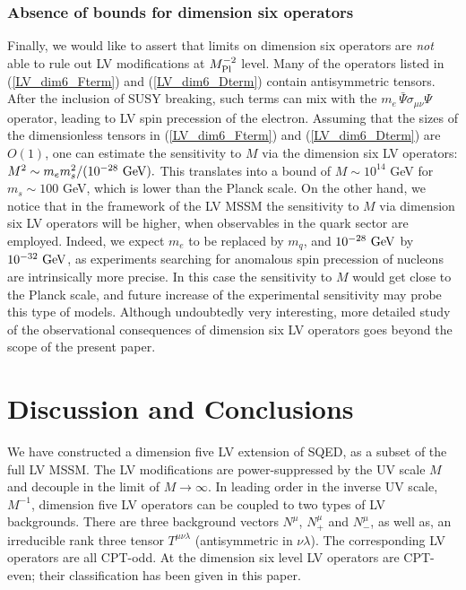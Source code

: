 \documentclass[12pt]{revtex4}
\begin{document}
\subsubsection*{Absence of bounds for dimension six operators}


Finally, we would like to assert that limits on dimension six operators 
are {\em not} able to rule out LV modifications at $M^{-2}_{\rm Pl}$ level. 
Many of the operators listed in (\ref{LV_dim6_Fterm}) and
(\ref{LV_dim6_Dterm}) contain antisymmetric tensors.  After the
inclusion of SUSY breaking, such terms can mix with the
$m_e\, \bar \Psi \sigma_{\mu\nu} \Psi$ operator, leading to 
LV spin precession of the electron. Assuming that the sizes of the
dimensionless tensors in (\ref{LV_dim6_Fterm}) and
(\ref{LV_dim6_Dterm}) are $O(1)$, one can estimate the sensitivity to $M$
via the dimension six LV operators:  
$M^2 \sim m_em_s^2/(10^{-28}~{\rm GeV}). $
This translates into a bound of $M \sim 10^{14}$ GeV for $m_s \sim
100$ GeV, which is lower than the Planck scale. On the other hand, we
notice that in the framework of the LV MSSM the sensitivity to $M$ via
dimension six LV operators will be higher, when observables in the
quark sector are employed. Indeed, we expect $m_e$ to be replaced 
by $m_q$, and $10^{-28}~{\rm GeV}$ by $10^{-32}~{\rm GeV}$, as 
experiments searching for anomalous spin precession of nucleons are
intrinsically more precise.  In this case the sensitivity to $M$
would get close to the Planck scale, and future increase of the
experimental sensitivity  may probe this type of models. Although
undoubtedly very interesting, more detailed study of the observational
consequences of  dimension six LV operators goes beyond the scope of
the present paper.  



\section{Discussion and Conclusions}
\label{conclusion} 


We have constructed a dimension five LV extension of SQED, 
as a subset of the full LV MSSM. The LV modifications are 
power-suppressed by the UV scale $M$ and decouple in the limit of
$M\to\infty$.  In leading order in the inverse UV scale, $M^{-1}$, 
dimension five LV operators can be coupled to two types of LV
backgrounds. There are three background vectors  
$N^\mu$, $N^\mu_+$ and $N^{\mu}_-$, as well as, an irreducible rank
three tensor $T^{\mu\nu\lambda}$ (antisymmetric in $\nu\lambda$). The
corresponding LV operators are all CPT-odd. At the dimension six level
LV operators are CPT-even; their classification has been given in 
this paper. 
\end{document}
